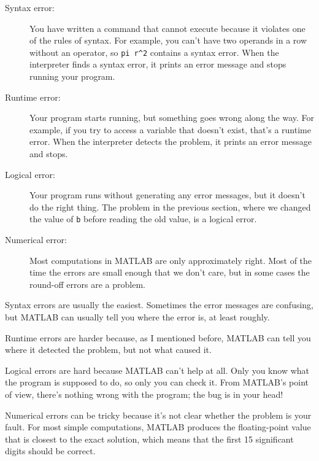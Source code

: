 \documentclass[
]{book}
\numberwithin{Answer}{chapter}
\numberwithin{Exercise}{chapter}
\begin{document}
\begin{description}

\item[Syntax error:] You have written a command that cannot
execute because it violates one of the rules of syntax.  For example,
you can't have two operands in a row without an operator, so
\verb+pi r^2+ contains a syntax error.  When the interpreter finds a syntax
error, it prints an error message and stops running your program.

\item[Runtime error:] Your program starts running, but something goes
wrong along the way.  For example, if you try to access a variable
that doesn't exist, that's a runtime error.  When the interpreter detects the
problem, it prints an error message and stops.

\item[Logical error:] Your program runs without generating any error
messages, but it doesn't do the right thing.  The problem in the
previous section, where we changed the value of {\tt b} before
reading the old value, is a logical error.

\item[Numerical error:] Most computations in MATLAB are only
approximately right.  Most of the time the errors are small enough
that we don't care, but in some cases the round-off errors are a problem.

\end{description}

Syntax errors are usually the easiest.  Sometimes the error messages
are confusing, but MATLAB can usually tell you where the error is, at
least roughly.

Runtime errors are harder because, as I mentioned before, MATLAB
can tell you where it detected the problem, but not what caused it.

Logical errors are hard because MATLAB can't help at all.  Only you
know what the program is supposed to do, so only you can check it.
From MATLAB's point of view, there's nothing wrong with the program;
the bug is in your head!

Numerical errors can be tricky because it's not clear whether the
problem is your fault.  For most simple computations, MATLAB produces
the floating-point value that is closest to the exact solution, which
means that the first 15 significant digits should be correct.  
\end{document}
